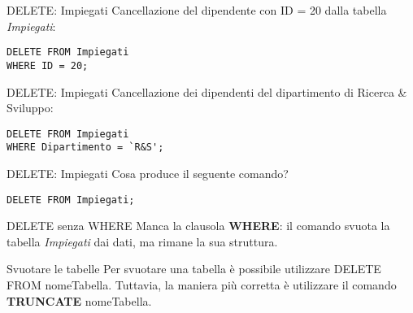 %
\begin{frame}[fragile]{DELETE: Impiegati}
Cancellazione del dipendente con ID = 20 dalla tabella \textit{Impiegati}:
\pause
\begin{lstlisting}
DELETE FROM Impiegati
WHERE ID = 20;
\end{lstlisting}
\end{frame}
%
\begin{frame}[fragile]{DELETE: Impiegati}
Cancellazione dei dipendenti del dipartimento di Ricerca \& Sviluppo:
\pause
\begin{lstlisting}
DELETE FROM Impiegati
WHERE Dipartimento = `R&S';
\end{lstlisting}
\end{frame}
%
\begin{frame}[fragile]{DELETE: Impiegati}
Cosa produce il seguente comando?
\begin{lstlisting}
DELETE FROM Impiegati;
\end{lstlisting}
\pause
\begin{alertblock}{DELETE senza WHERE}
Manca la clausola \textbf{WHERE}: il comando svuota la tabella \textit{Impiegati} dai dati, ma rimane la sua struttura.
\end{alertblock}
\pause
\begin{block}{Svuotare le tabelle}
Per svuotare una tabella \`e possibile utilizzare DELETE FROM nomeTabella. Tuttavia, la maniera pi\`u corretta \`e utilizzare il comando \textbf{TRUNCATE} nomeTabella.
\end{block}
\end{frame}
%